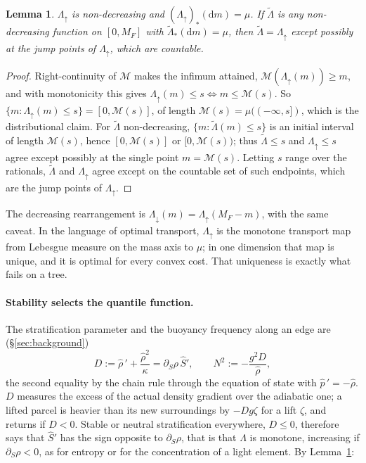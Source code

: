 \documentclass[11pt]{article}
\newtheorem{lemma}{Lemma}
\theoremstyle{definition}
\theoremstyle{remark}
\newcommand{\Mcdf}{\mathcal M}
\begin{document}
\begin{lemma}
\label{lem:quantile}
$\Lambda_\uparrow$ is non-decreasing and $(\Lambda_\uparrow)_*(\mathrm
dm) = \mu$. If $\tilde\Lambda$ is any non-decreasing function on $[0,
M_F]$ with $\tilde\Lambda_*(\mathrm dm) = \mu$, then $\tilde\Lambda =
\Lambda_\uparrow$ except possibly at the jump points of
$\Lambda_\uparrow$, which are countable.
\end{lemma}

\begin{proof}
Right-continuity of $\Mcdf$ makes the infimum attained,
$\Mcdf(\Lambda_\uparrow(m)) \ge m$, and with monotonicity this gives
$\Lambda_\uparrow(m) \le s \iff m \le \Mcdf(s)$. So $\{m :
\Lambda_\uparrow(m) \le s\} = [0, \Mcdf(s)]$, of length $\Mcdf(s) =
\mu((-\infty, s])$, which is the distributional claim. For
$\tilde\Lambda$ non-decreasing, $\{m : \tilde\Lambda(m) \le s\}$ is an
initial interval of length $\Mcdf(s)$, hence $[0, \Mcdf(s)]$ or $[0,
\Mcdf(s))$; thus $\tilde\Lambda \le s$ and $\Lambda_\uparrow \le s$
agree except possibly at the single point $m = \Mcdf(s)$. Letting $s$
range over the rationals, $\tilde\Lambda$ and $\Lambda_\uparrow$ agree
except on the countable set of such endpoints, which are the jump
points of $\Lambda_\uparrow$.
\end{proof}

The decreasing rearrangement is $\Lambda_\downarrow(m) =
\Lambda_\uparrow(M_F - m)$, with the same caveat. In the language of
optimal transport, $\Lambda_\uparrow$ is the monotone transport map
from Lebesgue measure on the mass axis to $\mu$; in one dimension that
map is unique, and it is optimal for every convex cost. That
uniqueness is exactly what fails on a tree.

\paragraph{Stability selects the quantile function.} The
stratification parameter and the buoyancy frequency along an edge are
(\S\ref{sec:background})
\begin{equation*}
  D := \hat\rho\,' + \frac{\hat\rho^2}{\kappa} = \partial_S\rho\,\hat S',
  \qquad N^2 := -\frac{g^2D}{\hat\rho} ,
\end{equation*}
the second equality by the chain rule through the equation of state
with $\hat p\,' = -\hat\rho$. $D$ measures the excess of the actual
density gradient over the adiabatic one; a lifted parcel is heavier
than its new surroundings by $-Dg\zeta$ for a lift $\zeta$, and
returns if $D < 0$. Stable or neutral stratification everywhere, $D
\le 0$, therefore says that $\hat S'$ has the sign opposite to
$\partial_S\rho$, that is that $\Lambda$ is monotone, increasing if
$\partial_S\rho < 0$, as for entropy or for the concentration of a
light element. By Lemma~\ref{lem:quantile}:
\end{document}
